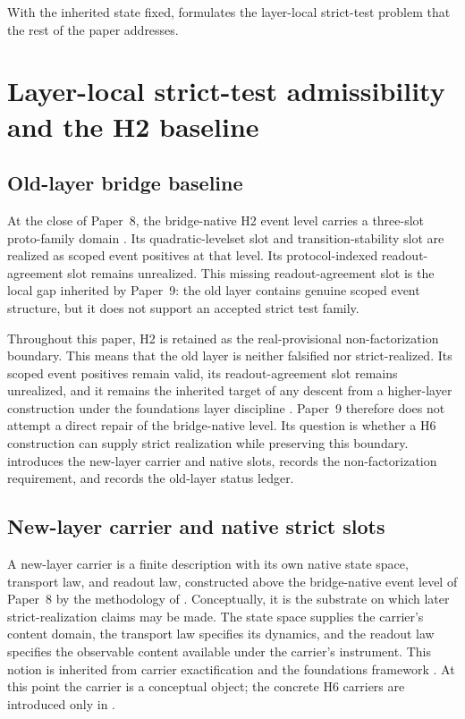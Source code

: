 \documentclass[11pt]{article}
\newcommand{\OldLayer}{H2}
\newcommand{\NewLayer}{H6}
\newcommand{\PaperNine}{Paper~9}
\newcommand{\PaperEight}{Paper~8}
\newcommand{\OldLayerStatus}{real-provisional non-factorization boundary}
\theoremstyle{definition}
\begin{document}
With the inherited state fixed,  formulates the
layer-local strict-test problem that the rest of the paper addresses.
 \section{Layer-local strict-test admissibility and the \OldLayer{} baseline}\label{sec:problem-setup}

\subsection{Old-layer bridge baseline}\label{subsec:h2-bridge-baseline}

At the close of \PaperEight{}, the bridge-native \OldLayer{} event level carries
a three-slot proto-family domain
\cite{Tsiokos2026CarrierToEvent}.  Its quadratic-levelset slot and
transition-stability slot are realized as scoped event positives at that level.
Its protocol-indexed readout-agreement slot remains unrealized.  This missing
readout-agreement slot is the local gap inherited by \PaperNine{}: the old layer
contains genuine scoped event structure, but it does not support an accepted
strict test family.

Throughout this paper, \OldLayer{} is retained as the \OldLayerStatus{}.  This
means that the old layer is neither falsified nor strict-realized.  Its scoped
event positives remain valid, its readout-agreement slot remains unrealized,
and it remains the inherited target of any descent from a higher-layer
construction under the foundations layer discipline
\cite{Tsiokos2026FoundationsII}.  \PaperNine{} therefore does not attempt a
direct repair of the bridge-native level.  Its question is whether a
\NewLayer{} construction can supply strict realization while preserving this
boundary.   introduces the new-layer
carrier and native slots,  records the
non-factorization requirement, and  records
the old-layer status ledger.

\subsection{New-layer carrier and native strict slots}\label{subsec:new-layer-carrier-native-slots}

A new-layer carrier is a finite description with its own native state space,
transport law, and readout law, constructed above the bridge-native event level
of \PaperEight{} by the methodology of .  Conceptually, it is
the substrate on which later strict-realization claims may be made.  The state
space supplies the carrier's content domain, the transport law specifies its
dynamics, and the readout law specifies the observable content available under
the carrier's instrument.  This notion is inherited from carrier
exactification and the foundations framework
\cite{Tsiokos2026CarrierExactification,Tsiokos2026FoundationsII}.  At this
point the carrier is a conceptual object; the concrete \NewLayer{} carriers are
introduced only in .
\end{document}
